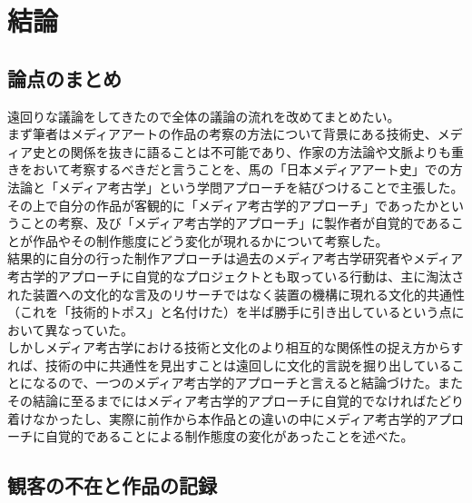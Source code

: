 \documentclass[a4paper,report]{jsbook}
\begin{document}
\chapter{結論}\label{ux7d50ux8ad6}

\section{論点のまとめ}\label{ux8ad6ux70b9ux306eux307eux3068ux3081}

遠回りな議論をしてきたので全体の議論の流れを改めてまとめたい。\\
まず筆者はメディアアートの作品の考察の方法について背景にある技術史、メディア史との関係を抜きに語ることは不可能であり、作家の方法論や文脈よりも重きをおいて考察するべきだと言うことを、馬の「日本メディアアート史」での方法論と「メディア考古学」という学問アプローチを結びつけることで主張した。\\
その上で自分の作品が客観的に「メディア考古学的アプローチ」であったかということの考察、及び「メディア考古学的アプローチ」に製作者が自覚的であることが作品やその制作態度にどう変化が現れるかについて考察した。\\
結果的に自分の行った制作アプローチは過去のメディア考古学研究者やメディア考古学的アプローチに自覚的なプロジェクトとも取っている行動は、主に淘汰された装置への文化的な言及のリサーチではなく装置の機構に現れる文化的共通性（これを「技術的トポス」と名付けた）を半ば勝手に引き出しているという点において異なっていた。\\
しかしメディア考古学における技術と文化のより相互的な関係性の捉え方からすれば、技術の中に共通性を見出すことは遠回しに文化的言説を掘り出していることになるので、一つのメディア考古学的アプローチと言えると結論づけた。またその結論に至るまでにはメディア考古学的アプローチに自覚的でなければたどり着けなかったし、実際に前作から本作品との違いの中にメディア考古学的アプローチに自覚的であることによる制作態度の変化があったことを述べた。

\section{観客の不在と作品の記録}\label{ux89b3ux5ba2ux306eux4e0dux5728ux3068ux4f5cux54c1ux306eux8a18ux9332}
\end{document}
